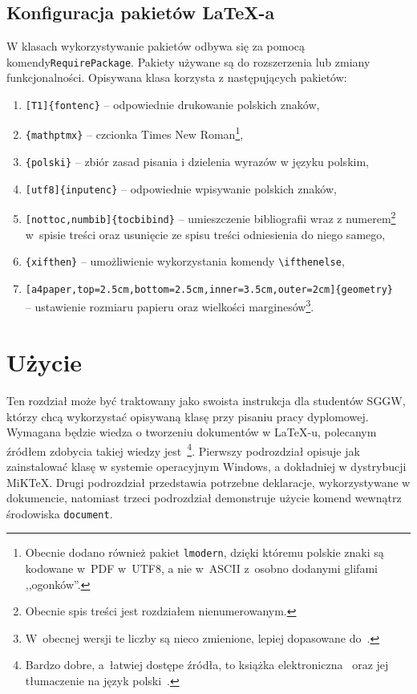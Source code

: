 \documentclass{SGGW-thesis}
\begin{document}
\section{Konfiguracja pakietów \LaTeX-a}
\label{sec:konfiguracja-pakietow}
W klasach wykorzystywanie pakietów odbywa się za pomocą komendy\linebreak \verb|RequirePackage|. Pakiety używane są do rozszerzenia lub zmiany funkcjonalności. Opisywana klasa korzysta
z następujących pakietów:
\begin{enumerate}[label=\alph*.,itemsep=0pt]
\item{\verb|[T1]{fontenc}| -- odpowiednie drukowanie polskich znaków,}
\item{\verb|{mathptmx}| -- czcionka Times New Roman\footnote{Obecnie dodano również pakiet {\tt lmodern}, dzięki któremu polskie znaki są kodowane w~PDF w~UTF8, a nie w~ASCII z~osobno dodanymi glifami ,,ogonków''.},}
\item{\verb|{polski}| -- zbiór zasad pisania i dzielenia wyrazów w języku polskim,}
\item{\verb|[utf8]{inputenc}| -- odpowiednie wpisywanie polskich znaków,}
\item{\verb|[nottoc,numbib]{tocbibind}| -- umieszczenie bibliografii wraz z numerem\footnote{Obecnie spis treści jest rozdziałem nienumerowanym.} w~spisie treści oraz usunięcie ze spisu treści odniesienia do niego samego,}
\item{\verb|{xifthen}| -- umożliwienie wykorzystania komendy \verb|\ifthenelse|,}
\item{\verb|[a4paper,top=2.5cm,bottom=2.5cm,inner=3.5cm,outer=2cm]{geometry}|\\ -- ustawienie rozmiaru papieru oraz wielkości marginesów\footnote{W~obecnej wersji te liczby są nieco zmienione, lepiej dopasowane do~\cite{wymagania-100}.}.}
\end{enumerate}


\chapter{Użycie}
Ten rozdział może być traktowany jako swoista instrukcja dla studentów SGGW, którzy chcą wykorzystać opisywaną klasę przy pisaniu pracy dyplomowej. Wymagana będzie wiedza o
tworzeniu dokumentów w \LaTeX-u, polecanym źródłem zdobycia takiej wiedzy jest~\cite{latexcompanion}\footnote{Bardzo dobre, a~łatwiej dostępe źródła, to książka elektroniczna~\cite{notsoshort} oraz jej tłumaczenie na język polski~\cite{notsoshortPL}.}. Pierwszy podrozdział opisuje jak zainstalować klasę w systemie
operacyjnym Windows, a dokładniej w dystrybucji MiK\TeX. Drugi podrozdział przedstawia  potrzebne deklaracje, wykorzystywane w dokumencie, natomiast trzeci podrozdział
demonstruje użycie komend wewnątrz środowiska \verb|document|.
\end{document}
